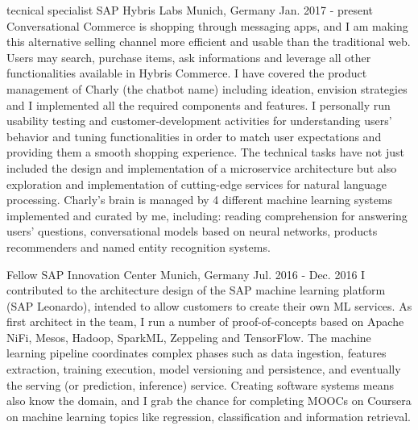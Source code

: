 

\begin{cventries}

  \cventry
    {tecnical specialist} %
    {SAP Hybris Labs} %
    {Munich, Germany} %
    {Jan. 2017 - present} %
    {
      Conversational Commerce is shopping through messaging apps, and I am making this alternative selling channel more efficient and usable than the traditional web.
      Users may search, purchase items, ask informations and leverage all other functionalities available in Hybris Commerce.
      I have covered the product management of Charly (the chatbot name) including ideation, envision strategies and
      I implemented all the required components and features.
      I personally run usability testing and customer-development activities for understanding users' behavior and tuning functionalities
      in order to match user expectations and providing them a smooth shopping experience.
      The technical tasks have not just included the design and implementation of a microservice architecture
      but also exploration and implementation of cutting-edge services for natural language processing.
      Charly's brain is managed by 4 different machine learning systems implemented and curated by me, including:
      reading comprehension for answering users' questions, conversational models based on neural networks, products recommenders and named entity recognition systems.
    }

  \cventry
    {Fellow} %
    {SAP Innovation Center} %
    {Munich, Germany} %
    {Jul. 2016 - Dec. 2016} %
    {
      I contributed to the architecture design of the SAP machine learning platform (SAP Leonardo), intended to allow customers to create their own ML services.
      As first architect in the team, I run a number of proof-of-concepts based on Apache NiFi, Mesos, Hadoop, SparkML,
      Zeppeling and TensorFlow. The machine learning pipeline coordinates complex phases such as data ingestion, features extraction, training execution,
      model versioning and persistence, and eventually the serving (or prediction, inference) service. Creating software systems means also know the domain,
      and I grab the chance for completing MOOCs on Coursera on machine learning topics like regression, classification and information retrieval.
    }


\end{cventries}

